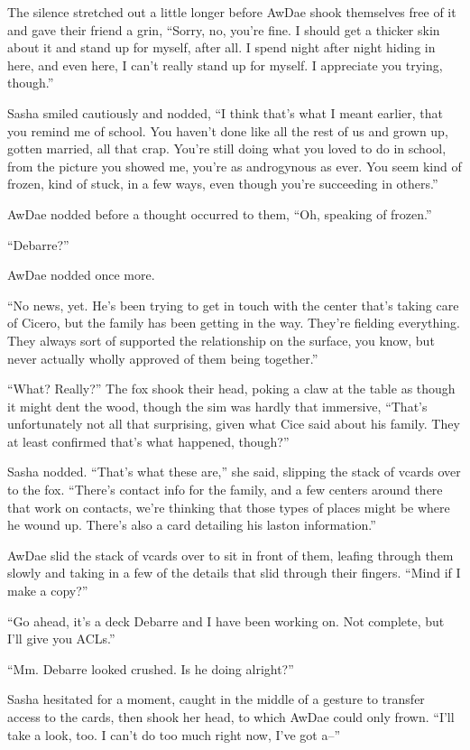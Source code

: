 The silence stretched out a little longer before AwDae shook themselves free of it and gave their friend a grin, ``Sorry, no, you're fine.  I should get a thicker skin about it and stand up for myself, after all.  I spend night after night hiding in here, and even here, I can't really stand up for myself.  I appreciate you trying, though.''

Sasha smiled cautiously and nodded, ``I think that's what I meant earlier, that you remind me of school.  You haven't done like all the rest of us and grown up, gotten married, all that crap.  You're still doing what you loved to do in school, from the picture you showed me, you're as androgynous as ever.  You seem kind of frozen, kind of stuck, in a few ways, even though you're succeeding in others.''

AwDae nodded before a thought occurred to them, ``Oh, speaking of frozen.''

``Debarre?''

AwDae nodded once more.

``No news, yet.  He's been trying to get in touch with the center that's taking care of Cicero, but the family has been getting in the way.  They're fielding everything.  They always sort of supported the relationship on the surface, you know, but never actually wholly approved of them being together.''

``What?  Really?''  The fox shook their head, poking a claw at the table as though it might dent the wood, though the sim was hardly that immersive, ``That's unfortunately not all that surprising, given what Cice said about his family.  They at least confirmed that's what happened, though?''

Sasha nodded. ``That's what these are,'' she said, slipping the stack of vcards over to the fox.  ``There's contact info for the family, and a few centers around there that work on contacts, we're thinking that those types of places might be where he wound up.  There's also a card detailing his laston information.''

AwDae slid the stack of vcards over to sit in front of them, leafing through them slowly and taking in a few of the details that slid through their fingers.  ``Mind if I make a copy?''

``Go ahead, it's a deck Debarre and I have been working on.  Not complete, but I'll give you ACLs.''

``Mm.  Debarre looked crushed.  Is he doing alright?''

Sasha hesitated for a moment, caught in the middle of a gesture to transfer access to the cards, then shook her head, to which AwDae could only frown.  ``I'll take a look, too.  I can't do too much right now, I've got a--''

